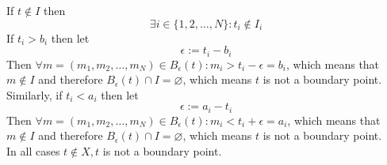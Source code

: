 \documentclass[11pt]{article}
\begin{document}
If $t \notin I$ then 
\[\exists i \in \{1,2,\ldots,N\}: t_i \notin I_i\]
If $t_i>b_i$ then let
\[
\epsilon:= t_i - b_i
\]
Then $\forall m=(m_1,m_2,\ldots, m_N) \in B_\epsilon(t): m_i > t_i - \epsilon = b_i$, which means that $m \notin I$ and therefore $B_\epsilon(t) \cap I = \varnothing$, which means $t$ is not a boundary point. \\
Similarly, if $t_i<a_i$ then let
\[
\epsilon:= a_i - t_i
\]
Then $\forall m=(m_1,m_2,\ldots, m_N) \in B_\epsilon(t): m_i < t_i + \epsilon = a_i$, which means that $m \notin I$ and therefore $B_\epsilon(t) \cap I = \varnothing$, which means $t$ is not a boundary point. \\
In all cases $t \notin X, t$ is not a boundary point.
\end{document}
